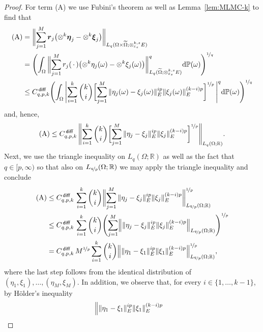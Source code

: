 \documentclass[reqno]{amsart}
\numberwithin{equation}{section}
\newcommand{\bbP}{\mathbb{P}}
\newcommand{\bbR}{\mathbb{R}}
\newcommand{\rvec}{\boldsymbol{r}}
\newcommand{\etavec}{\boldsymbol{\eta}}
\newcommand{\xivec}{\boldsymbol{\xi}}
\newcommand{\xk}{\otimes^k}
\newcommand{\xkseps}{\otimes^{k,s}_{\varepsilon_s}}
\newcommand{\norm}[2]{     \| #1       \|_{ #2 }}
\newcommand{\rd}{\mathrm{d}}
\newcommand{\Cdiff}{C^{\,\sf diff}_{q,p,k}}
\theoremstyle{remark}
\theoremstyle{definition}
\begin{document}
\begin{proof}
	For term (A) we use Fubini's theorem 
	as well as Lemma~\ref{lem:MLMC-k} 
	to find that 
	\begin{align*} 
	\text{(A)} 
	&= 
	\biggl\| 
	\sum_{j=1}^M 
	\rvec_j 
	\bigl( \xk \etavec_j  - \xk \xivec_j  \bigr) 
	\biggr\|_{L_q(\Omega\times\widetilde{\Omega};\xkseps E)}   
	\\
	&= 
	\Biggl( 
	\int_\Omega 
	\,\biggl\| 
	\sum_{j=1}^M 
	r_j (\,\cdot\,) 
	\bigl( \xk \eta_j(\omega) - \xk \xi_j(\omega) \bigr) 
	\biggr\|_{L_q(\widetilde{\Omega};\xkseps E)}^q 
	\rd\bbP(\omega)
	\Biggr)^{\nicefrac{1}{q}} 
	\\
	&\leq 
	\Cdiff  
	\Biggl( 
	\int_\Omega 
	\,\Biggl| 
	\sum_{i=1}^k 
	\binom{k}{i} 
	\biggl[  
	\sum_{j=1}^M 
	\norm{ \eta_j(\omega) - \xi_j(\omega)}{E}^{ip} 
	\norm{ \xi_j(\omega) }{E}^{(k-i)p} 
	\biggr]^{\nicefrac{1}{p}} 
	\,\Biggr|^q 
	\rd\bbP(\omega)
	\Biggr)^{\nicefrac{1}{q}} 
	\end{align*}
	and, hence, 
	\[
	\text{(A)} 
	\leq 
	\Cdiff \, 
	\Biggl\| 
	\sum_{i=1}^k 
	\binom{k}{i} 
	\biggl[  
	\sum_{j=1}^M 
	\norm{ \eta_j - \xi_j }{E}^{ip} 
	\norm{ \xi_j }{E}^{(k-i)p} 
	\biggr]^{\nicefrac{1}{p}} 
	\Biggr\|_{L_q(\Omega;\bbR)} . 
	\]
	Next, we use the triangle inequality on $L_q(\Omega;\bbR)$ 
	as well as the fact that $q\in[p,\infty)$ so that 
	also on $L_{\nicefrac{q}{p}}(\Omega;\bbR)$ 
	we may apply the triangle inequality and 
	conclude 
	\begin{align*} 
	\text{(A)} 
	&\leq 
	\Cdiff \, 
	\sum_{i=1}^k 
	\binom{k}{i} 
	\biggl\| 
	\sum_{j=1}^M 
	\norm{ \eta_j - \xi_j }{E}^{ip} 
	\norm{ \xi_j }{E}^{(k-i)p} 
	\biggr\|_{L_{\nicefrac{q}{p}}(\Omega;\bbR)}^{\nicefrac{1}{p}} 
	\\
	&\leq 
	\Cdiff \, 
	\sum_{i=1}^k 
	\binom{k}{i} 
	\Biggl( 
	\sum_{j=1}^M 
	\Bigl\| 
	\norm{ \eta_j - \xi_j }{E}^{ip} 
	\norm{ \xi_j }{E}^{(k-i)p} 
	\Bigr\|_{L_{\nicefrac{q}{p}}(\Omega;\bbR)}
	\Biggr)^{\nicefrac{1}{p}} 
	\\
	&= 
	\Cdiff \, 
	M^{\nicefrac{1}{p}} 
	\sum_{i=1}^k 
	\binom{k}{i} 
	\Bigl\| 
	\norm{ \eta_1 - \xi_1 }{E}^{ip} 
	\norm{ \xi_1 }{E}^{(k-i)p} 
	\Bigr\|_{L_{\nicefrac{q}{p}}(\Omega;\bbR)}^{\nicefrac{1}{p}} , 
	\end{align*} 
	where the last step follows from the identical 
	distribution of 
	$(\eta_1,\xi_1), \ldots,(\eta_M,\xi_M)$. 
	In addition, we observe that, 
	for every $i\in\{1,\ldots,k-1\}$, 
	by H\"older's inequality 
	\begin{align*} 
	\Bigl\| 
	&\norm{ \eta_1 - \xi_1 }{E}^{ip} 
	\norm{ \xi_1 }{E}^{(k-i)p} 

\end{align*}
\end{proof}
\end{document}
